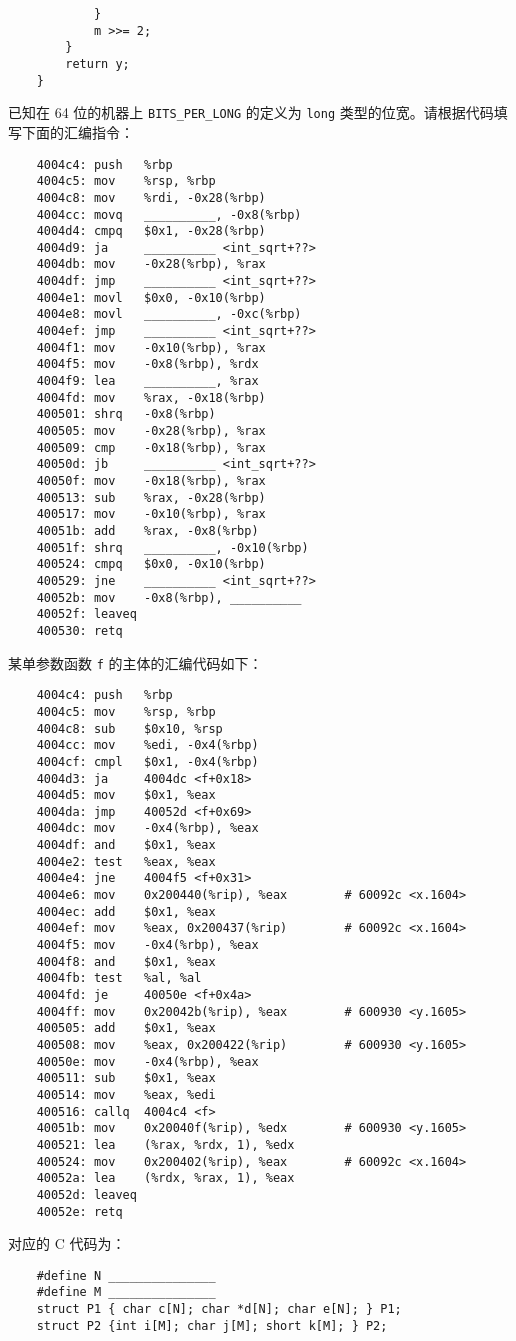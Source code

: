 \begin{problems}
\begin{verbatim}
            } 
            m >>= 2; 
        } 
        return y; 
    } 
        \end{verbatim}
        已知在 64 位的机器上 \verb|BITS_PER_LONG| 的定义为 \verb|long| 类型的位宽。请根据代码填写下面的汇编指令：
        \begin{verbatim}
    4004c4: push   %rbp
    4004c5: mov    %rsp, %rbp
    4004c8: mov    %rdi, -0x28(%rbp)
    4004cc: movq   __________, -0x8(%rbp)
    4004d4: cmpq   $0x1, -0x28(%rbp)
    4004d9: ja     __________ <int_sqrt+??>
    4004db: mov    -0x28(%rbp), %rax
    4004df: jmp    __________ <int_sqrt+??>
    4004e1: movl   $0x0, -0x10(%rbp)
    4004e8: movl   __________, -0xc(%rbp)
    4004ef: jmp    __________ <int_sqrt+??>
    4004f1: mov    -0x10(%rbp), %rax
    4004f5: mov    -0x8(%rbp), %rdx
    4004f9: lea    __________, %rax
    4004fd: mov    %rax, -0x18(%rbp)
    400501: shrq   -0x8(%rbp)
    400505: mov    -0x28(%rbp), %rax
    400509: cmp    -0x18(%rbp), %rax
    40050d: jb     __________ <int_sqrt+??>
    40050f: mov    -0x18(%rbp), %rax
    400513: sub    %rax, -0x28(%rbp)
    400517: mov    -0x10(%rbp), %rax
    40051b: add    %rax, -0x8(%rbp)
    40051f: shrq   __________, -0x10(%rbp)
    400524: cmpq   $0x0, -0x10(%rbp)
    400529: jne    __________ <int_sqrt+??>
    40052b: mov    -0x8(%rbp), __________
    40052f: leaveq
    400530: retq
        \end{verbatim}
         某单参数函数 \verb|f| 的主体的汇编代码如下：
        \begin{verbatim}
    4004c4: push   %rbp
    4004c5: mov    %rsp, %rbp
    4004c8: sub    $0x10, %rsp
    4004cc: mov    %edi, -0x4(%rbp)
    4004cf: cmpl   $0x1, -0x4(%rbp)
    4004d3: ja     4004dc <f+0x18>
    4004d5: mov    $0x1, %eax
    4004da: jmp    40052d <f+0x69>
    4004dc: mov    -0x4(%rbp), %eax
    4004df: and    $0x1, %eax
    4004e2: test   %eax, %eax
    4004e4: jne    4004f5 <f+0x31>
    4004e6: mov    0x200440(%rip), %eax        # 60092c <x.1604>
    4004ec: add    $0x1, %eax
    4004ef: mov    %eax, 0x200437(%rip)        # 60092c <x.1604>
    4004f5: mov    -0x4(%rbp), %eax
    4004f8: and    $0x1, %eax
    4004fb: test   %al, %al
    4004fd: je     40050e <f+0x4a>
    4004ff: mov    0x20042b(%rip), %eax        # 600930 <y.1605>
    400505: add    $0x1, %eax
    400508: mov    %eax, 0x200422(%rip)        # 600930 <y.1605>
    40050e: mov    -0x4(%rbp), %eax
    400511: sub    $0x1, %eax
    400514: mov    %eax, %edi
    400516: callq  4004c4 <f>
    40051b: mov    0x20040f(%rip), %edx        # 600930 <y.1605>
    400521: lea    (%rax, %rdx, 1), %edx
    400524: mov    0x200402(%rip), %eax        # 60092c <x.1604>
    40052a: lea    (%rdx, %rax, 1), %eax
    40052d: leaveq
    40052e: retq
        \end{verbatim}
        对应的 C 代码为：
        \begin{verbatim}
    #define N _______________
    #define M _______________
    struct P1 { char c[N]; char *d[N]; char e[N]; } P1;
    struct P2 {int i[M]; char j[M]; short k[M]; } P2;
 

\end{verbatim}
\end{problems}
